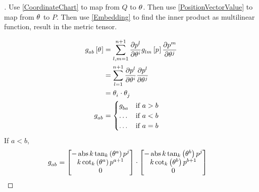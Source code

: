 \documentclass[stu, babel, american, biblatex, a4paper, draftall]{apa7}
\begin{document}
\begin{proof}[]
    \skipped

    Use \cref{CoordinateChart} to map from $Q$ to $\tensor{\theta}{}$.
    Then use \cref{PositionVectorValue} to map from $\tensor{\theta}{}$ to $P$.
    Then use \cref{Embedding} to find the inner product as multilinear function, result in the metric tensor.

    \begin{align*}
        \tensor{g}{_a_b}\left[\tensor{\theta}{}\right]
         & = \sum_{l,m=1}^{n+1}{
        \frac{\partial{\tensor{p}{^l}}}{\partial{\tensor{\theta}{^i}}}
        \tensor{g}{_l_m}\left[\tensor{p}{}\right]
        \frac{\partial{\tensor{p}{^m}}}{\partial{\tensor{\theta}{^j}}}
        }                                                \\
         & = \sum_{l=1}^{n+1}{
        \frac{\partial{\tensor{p}{^l}}}{\partial{\tensor{\theta}{^i}}}
        \frac{\partial{\tensor{p}{^l}}}{\partial{\tensor{\theta}{^j}}}
        }                                                \\
         & = \tensor{\theta}{_i}\cdot\tensor{\theta}{_j} \\
        \tensor{g}{_a_b}
         & = \begin{cases}
            \tensor{g}{_b_a} & \text{if $a>b$} \\
            \dots            & \text{if $a<b$} \\
            \dots            & \text{if $a=b$}
        \end{cases}
    \end{align*}
    If $a<b$,
    \begin{align*}
        \tensor{g}{_a_b}
         & =\begin{bmatrix}
            -\abs{k}\tan_k\left(\tensor{\theta}{^a}\right)\tensor{p}{^j} \\
            k\cot_k\left(\tensor{\theta}{^a}\right)\tensor{p}{^{a+1}}    \\
            0                                                            \\
        \end{bmatrix}\cdot\begin{bmatrix}
            -\abs{k}\tan_k\left(\tensor{\theta}{^b}\right)\tensor{p}{^j} \\
            k\cot_k\left(\tensor{\theta}{^b}\right)\tensor{p}{^{b+1}}    \\
            0                                                            \\

\end{bmatrix}
\end{align*}
\end{proof}
\end{document}
